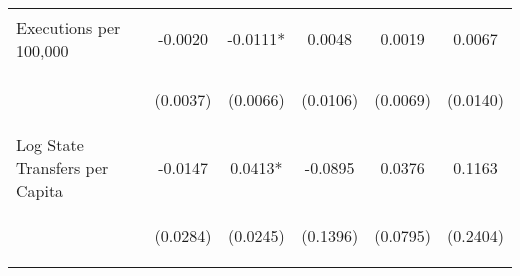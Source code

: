 \begin{center}
\begin{tabular}{lccccc}
\noalign{\smallskip}Executions per 100,000 & \begin{scriptsize}-0.0020\end{scriptsize} & \begin{scriptsize}-0.0111*\end{scriptsize} & \begin{scriptsize}0.0048\end{scriptsize} & \begin{scriptsize}0.0019\end{scriptsize} & \begin{scriptsize}0.0067\end{scriptsize}\\
 & \begin{scriptsize}(0.0037)\end{scriptsize} & \begin{scriptsize}(0.0066)\end{scriptsize} & \begin{scriptsize}(0.0106)\end{scriptsize} & \begin{scriptsize}(0.0069)\end{scriptsize} & \begin{scriptsize}(0.0140)\end{scriptsize}\\
\noalign{\smallskip}Log State Transfers per Capita & \begin{scriptsize}-0.0147\end{scriptsize} & \begin{scriptsize}0.0413*\end{scriptsize} & \begin{scriptsize}-0.0895\end{scriptsize} & \begin{scriptsize}0.0376\end{scriptsize} & \begin{scriptsize}0.1163\end{scriptsize}\\
 & \begin{scriptsize}(0.0284)\end{scriptsize} & \begin{scriptsize}(0.0245)\end{scriptsize} & \begin{scriptsize}(0.1396)\end{scriptsize} & \begin{scriptsize}(0.0795)\end{scriptsize} & \begin{scriptsize}(0.2404)\end{scriptsize}\\

\end{tabular}
\end{center}
